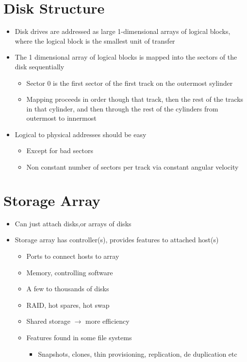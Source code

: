 \documentclass{article}[18pt]
\begin{document}
\section{Disk Structure}
\begin{itemize}
	\item Disk drives are addressed as large 1-dimensional arrays of logical blocks, where the logical block is the smallest unit of transfer
	\item The 1 dimensional array of logical blocks is mapped into the sectors of the disk sequentially
	\begin{itemize}
		\item Sector 0 is the first sector of the first track on the outermost sylinder
		\item Mapping proceeds in order though that track, then the rest of the tracks in that cylinder, and then through the rest of the cylinders from outermost to innermost
	\end{itemize}
	\item Logical to physical addresses should be easy
	\begin{itemize}
		\item Except for bad sectors
		\item Non constant number of sectors per track via constant angular velocity
	\end{itemize}
\end{itemize}
\section{Storage Array}
\begin{itemize}
	\item Can just attach disks,or arrays of disks
	\item Storage array has controller(s), provides features to attached host(s)
	\begin{itemize}
		\item Ports to connect hosts to array
		\item Memory, controlling software
		\item A few to thousands of disks
		\item RAID, hot spares, hot swap
		\item Shared storage $\rightarrow$ more efficiency
		\item Features found in some file systems
		\begin{itemize}
			\item Snapshots, clones, thin provisioning, replication, de duplication etc
		\end{itemize}
	\end{itemize}
\end{itemize}
\end{document}
